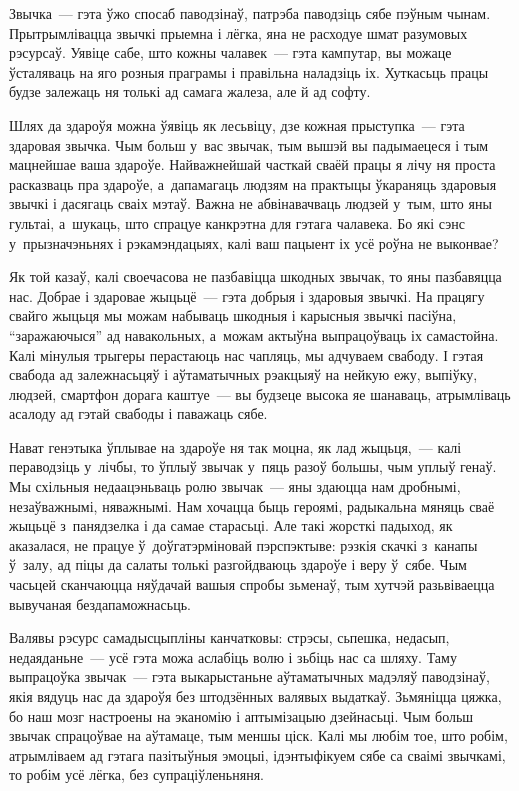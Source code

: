 Звычка~--- гэта ўжо спосаб паводзінаў, патрэба паводзіць сябе пэўным чынам. Прытрымлівацца звычкі прыемна і лёгка, яна не расходуе шмат разумовых рэсурсаў. Уявіце сабе, што кожны чалавек~--- гэта кампутар, вы можаце ўсталяваць на яго розныя праграмы і правільна наладзіць іх. Хуткасьць працы будзе залежаць ня толькі ад самага жалеза, але й ад софту.

Шлях да здароўя можна ўявіць як лесьвіцу, дзе кожная прыступка~--- гэта здаровая звычка. Чым больш у~вас звычак, тым вышэй вы падымаецеся і тым мацнейшае ваша здароўе. Найважнейшай часткай сваёй працы я лічу ня проста расказваць пра здароўе, а~дапамагаць людзям на практыцы ўкараняць здаровыя звычкі і дасягаць сваіх мэтаў. Важна не абвінавачваць людзей у~тым, што яны гультаі, а~шукаць, што спрацуе канкрэтна для гэтага чалавека. Бо які сэнс у~прызначэньнях і рэкамэндацыях, калі ваш пацыент іх усё роўна не выконвае?

Як той казаў, калі своечасова не пазбавіцца шкодных звычак, то яны пазбавяцца нас. Добрае і здаровае жыцьцё~--- гэта добрыя і здаровыя звычкі. На працягу свайго жыцьця мы можам набываць шкодныя і карысныя звычкі пасіўна, ``заражаючыся'' ад навакольных, а~можам актыўна выпрацоўваць іх самастойна. Калі мінулыя трыгеры перастаюць нас чапляць, мы адчуваем свабоду. І гэтая свабода ад залежнасьцяў і аўтаматычных рэакцыяў на нейкую ежу, выпіўку, людзей, смартфон дорага каштуе~--- вы будзеце высока яе шанаваць, атрымліваць асалоду ад гэтай свабоды і паважаць сябе.

Нават генэтыка ўплывае на здароўе ня так моцна, як лад жыцьця,~--- калі пераводзіць у~лічбы, то ўплыў звычак у~пяць разоў большы, чым уплыў генаў. Мы схільныя недаацэньваць ролю звычак~--- яны здаюцца нам дробнымі, незаўважнымі, няважнымі. Нам хочацца быць героямі, радыкальна мяняць сваё жыцьцё з~панядзелка і да самае старасьці. Але такі жорсткі падыход, як аказалася, не працуе ў~доўгатэрміновай пэрспэктыве: рэзкія скачкі з~канапы ў~залу, ад піцы да салаты толькі разгойдваюць здароўе і веру ў~сябе. Чым часьцей сканчаюцца няўдачай вашыя спробы зьменаў, тым хутчэй разьвіваецца вывучаная бездапаможнасьць.

Валявы рэсурс самадысцыпліны канчатковы: стрэсы, сьпешка, недасып, недаяданьне~--- усё гэта можа аслабіць волю і зьбіць нас са шляху. Таму выпрацоўка звычак~--- гэта выкарыстаньне аўтаматычных мадэляў паводзінаў, якія вядуць нас да здароўя без штодзённых валявых выдаткаў. Зьмяніцца цяжка, бо наш мозг настроены на эканомію і аптымізацыю дзейнасьці. Чым больш звычак спрацоўвае на аўтамаце, тым меншы ціск. Калі мы любім тое, што робім, атрымліваем ад гэтага пазітыўныя эмоцыі, ідэнтыфікуем сябе са сваімі звычкамі, то робім усё лёгка, без супраціўленьняня.

